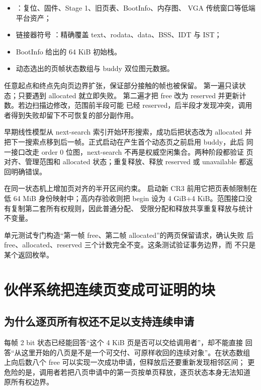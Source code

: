 \begin{itemize}
  \item \code{[0,1 MiB)}：复位、固件、Stage 1、旧页表、BootInfo、内存图、
        VGA 传统窗口等低端平台资产；
  \item 链接器符号 ：精确覆盖
        text、rodata、data、BSS、IDT 与 IST；
  \item BootInfo 给出的 64 KiB 初始栈。
  \item 动态选出的页帧状态数组与 buddy 双位图元数据。
\end{itemize}

任意起点和终点先向页边界扩张，保证部分接触的帧也被保留。
 第一遍只读状态；只要遇到 allocated 就立即失败。
第二遍才把 free 改为 reserved 并更新计数。若边扫描边修改，范围前半段可能
已经 reserved，后半段才发现冲突，调用者得到失败却留下不可恢复的部分副作用。

早期线性模型从 next-search 索引开始环形搜索，成功后把状态改为 allocated
并把下一搜索点移到后一帧。正式启动在产生首个动态页之前启用 buddy，此后
同一接口改走 order 0 位图，next-search 不再是权威空闲集合。两种阶段都验证
页对齐、管理范围和 allocated 状态；重复释放、释放 reserved 或 unavailable
都返回明确错误。

 在同一状态机上增加页对齐的半开区间约束。
启动新 CR3 前用它把页表帧限制在低 64 MiB 身份映射中；高内存验收则把
begin 设为 4 GiB+4 KiB。范围接口没有复制第二套所有权规则，因此普通分配、
受限分配和释放共享重复释放与统计不变量。

单元测试专门构造“第一帧 free、第二帧 allocated”的两页保留请求，确认失败
后 free、allocated、reserved 三个计数完全不变。这条测试验证事务边界，而
不只是某个返回枚举。

\section{伙伴系统把连续页变成可证明的块}

\subsection{为什么逐页所有权还不足以支持连续申请}

每帧 2 bit 状态已经能回答“这个 4 KiB 页是否可以交给调用者”，却不能直接
回答“从这里开始的八页是不是一个可交付、可原样收回的连续对象”。在状态数组
上向后数八个 free 可以实现一次成功申请，但释放后还要重新发现相邻区间；
更危险的是，调用者若把八页申请中的第一页按单页释放，逐页状态本身无法知道
原所有权边界。

